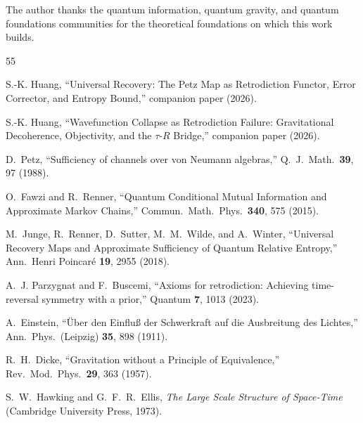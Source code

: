\documentclass[prl,twocolumn,superscriptaddress,longbibliography,floatfix]{revtex4-2}
\begin{document}
\begin{acknowledgments}
The author thanks the quantum information, quantum gravity,
and quantum foundations communities for the theoretical
foundations on which this work builds.
\end{acknowledgments}


\begin{thebibliography}{55}


S.-K. Huang,
``Universal Recovery: The Petz Map as Retrodiction Functor,
Error Corrector, and Entropy Bound,''
companion paper (2026).

S.-K. Huang,
``Wavefunction Collapse as Retrodiction Failure: Gravitational
Decoherence, Objectivity, and the $\tau$-$R$ Bridge,''
companion paper (2026).


D.~Petz,
``Sufficiency of channels over von Neumann algebras,''
Q.\ J.\ Math.\ \textbf{39}, 97 (1988).

O.~Fawzi and R.~Renner,
``Quantum Conditional Mutual Information and Approximate
Markov Chains,''
Commun.\ Math.\ Phys.\ \textbf{340}, 575 (2015).

M.~Junge, R.~Renner, D.~Sutter, M.~M.~Wilde, and A.~Winter,
``Universal Recovery Maps and Approximate Sufficiency of
Quantum Relative Entropy,''
Ann.\ Henri Poincar\'{e} \textbf{19}, 2955 (2018).

A.~J. Parzygnat and F.~Buscemi,
``Axioms for retrodiction: Achieving time-reversal symmetry
with a prior,''
Quantum \textbf{7}, 1013 (2023).


A.~Einstein,
``\"{U}ber den Einflu{\ss} der Schwerkraft auf die
Ausbreitung des Lichtes,''
Ann.\ Phys.\ (Leipzig) \textbf{35}, 898 (1911).

R.~H.~Dicke,
``Gravitation without a Principle of Equivalence,''
Rev.\ Mod.\ Phys.\ \textbf{29}, 363 (1957).

S.~W.~Hawking and G.~F.~R.~Ellis,
\emph{The Large Scale Structure of Space-Time}
(Cambridge University Press, 1973).


\end{thebibliography}
\end{document}
